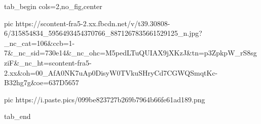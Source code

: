  
 
 
 
 


\ifcmt
  tab_begin cols=2,no_fig,center

     pic https://scontent-fra5-2.xx.fbcdn.net/v/t39.30808-6/315854834_5956493454370766_8871267835661529125_n.jpg?_nc_cat=106&ccb=1-7&_nc_sid=730e14&_nc_ohc=M5pedLTuQUIAX9jXKzJ&tn=p3ZpkpW_rS8sgziF&_nc_ht=scontent-fra5-2.xx&oh=00_AfA0NK7uAp0DisyW0TVkuSHryCd7CGWQSmqtKc-B32hg7g&oe=637D5657

     pic https://i.paste.pics/099be823727b269b7964b66fe61ad189.png

  tab_end
\fi
